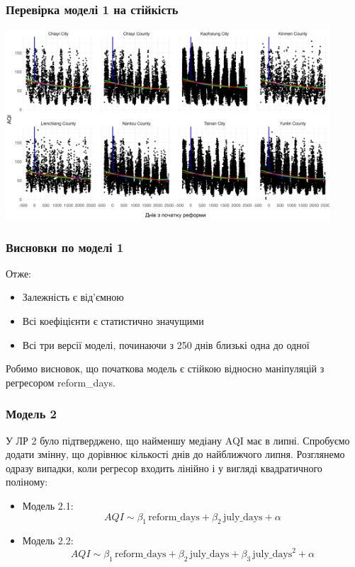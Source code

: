 \documentclass{beamer}
\begin{document}
\begin{frame}
  \frametitle{Перевірка моделі 1 на стійкість}
  
  \includegraphics[height=2.8in]{plots/lab3/model-1-reform-vs-aqi.png}
\end{frame}

\begin{frame}
  \frametitle{Висновки по моделі 1}
  
  Отже:
  
  \begin{itemize}
    \item Залежність є від'ємною
    \item Всі коефіцієнти є статистично значущими
    \item Всі три версії моделі, починаючи з 250 днів близькі одна до одної
  \end{itemize}
  
  Робимо висновок, що початкова модель є стійкою відносно маніпуляцій з регресором reform\_days.
\end{frame}

\begin{frame}
  \frametitle{Модель 2}

  У ЛР 2 було підтверджено, що найменшу медіану AQI має в липні. Спробуємо додати змінну, що дорівнює кількості днів до найближчого липня. Розглянемо одразу випадки, коли регресор входить лінійно і у вигляді квадратичного поліному:

  \begin{itemize}
    \item Модель 2.1: $$AQI \sim \beta_1 \, \text{reform\_days} +  \beta_2 \, \text{july\_days} + \alpha $$
    \item Модель 2.2: $$AQI \sim \beta_1 \, \text{reform\_days} +  \beta_2 \, \text{july\_days} +  \beta_3 \, \text{july\_days}^2  + \alpha $$
  \end{itemize}
\end{frame}
\end{document}
